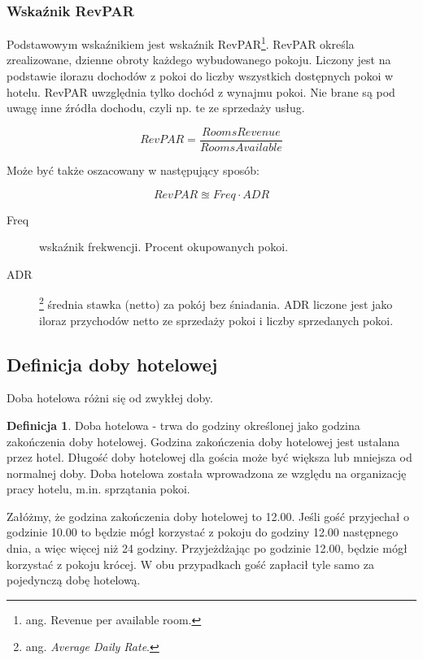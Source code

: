 \documentclass[a4paper,onecolumn,oneside,11pt,wide,floatssmall]{mwrep}
\theoremstyle{definition}
\newtheorem{defn}{Definicja}[section]
\theoremstyle{plain}%
\theoremstyle{remark}
\begin{document}
\subsubsection{Wskaźnik RevPAR}
Podstawowym wskaźnikiem jest wskaźnik RevPAR\footnote{ang. Revenue per 
available room.}. RevPAR określa zrealizowane, 
dzienne obroty każdego wybudowanego pokoju. Liczony jest na podstawie
 ilorazu dochodów z pokoi do liczby wszystkich dostępnych pokoi w hotelu. RevPAR uwzględnia tylko 
 dochód z wynajmu pokoi. Nie brane są pod uwagę inne źródła dochodu, czyli np. te ze sprzedaży usług.

\begin{equation}
RevPAR = \frac{Rooms Revenue}{Rooms Available}
\end{equation}

Może być także oszacowany w następujący sposób:

\begin{equation}
RevPAR \approxeq Freq \cdot ADR
\end{equation}

\begin{description}
  \item[Freq] wskaźnik frekwencji. Procent okupowanych pokoi.
  \item[ADR]\footnote{ang. {\em Average Daily Rate}. } średnia stawka (netto) 
  za pokój bez śniadania. ADR liczone jest jako iloraz przychodów netto ze 
  sprzedaży pokoi i liczby sprzedanych pokoi.

\end{description}

\subsection{Definicja doby hotelowej}
Doba hotelowa różni się od zwykłej doby.

\begin{defn}{Doba hotelowa} - trwa do godziny określonej jako godzina 
zakończenia doby 
hotelowej. Godzina zakończenia doby hotelowej jest ustalana przez hotel.
 Długość doby hotelowej dla gościa może być większa lub mniejsza 
od normalnej doby. Doba hotelowa została wprowadzona ze względu na 
organizację pracy hotelu, m.in. sprzątania pokoi.

\end{defn}

Załóżmy, że godzina zakończenia doby hotelowej to 12.00. Jeśli gość 
przyjechał o godzinie 10.00 to będzie mógł korzystać z pokoju do godziny 12.00 
następnego dnia, a więc więcej niż 24 godziny. Przyjeżdżając po godzinie 12.00, 
będzie mógł korzystać z pokoju krócej. W obu przypadkach gość zapłacił tyle 
samo za pojedynczą dobę hotelową.
\end{document}
